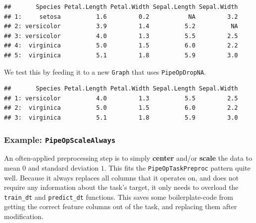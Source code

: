 \documentclass[]{scrbook}
\newenvironment{Shaded}{\begin{snugshade}}{\end{snugshade}}
\newcommand{\DecValTok}[1]{\textcolor[rgb]{0.00,0.00,0.81}{#1}}
\newcommand{\KeywordTok}[1]{\textcolor[rgb]{0.13,0.29,0.53}{\textbf{#1}}}
\newcommand{\NormalTok}[1]{#1}
\newcommand{\OperatorTok}[1]{\textcolor[rgb]{0.81,0.36,0.00}{\textbf{#1}}}
\newcommand{\StringTok}[1]{\textcolor[rgb]{0.31,0.60,0.02}{#1}}
\renewenvironment{Shaded} {\begin{snugshade}\small} {\end{snugshade}}
\begin{document}
\begin{verbatim}
##       Species Petal.Length Petal.Width Sepal.Length Sepal.Width
## 1:     setosa          1.6         0.2           NA         3.2
## 2: versicolor          3.9         1.4          5.2          NA
## 3: versicolor          4.0         1.3          5.5         2.5
## 4:  virginica          5.0         1.5          6.0         2.2
## 5:  virginica          5.1         1.8          5.9         3.0
\end{verbatim}

We test this by feeding it to a new \texttt{Graph} that uses \texttt{PipeOpDropNA}.

\begin{Shaded}
\end{Shaded}

\begin{verbatim}
##       Species Petal.Length Petal.Width Sepal.Length Sepal.Width
## 1: versicolor          4.0         1.3          5.5         2.5
## 2:  virginica          5.0         1.5          6.0         2.2
## 3:  virginica          5.1         1.8          5.9         3.0
\end{verbatim}

\hypertarget{example-pipeopscalealways}{%
\subsubsection{\texorpdfstring{Example: \texttt{PipeOpScaleAlways}}{Example: PipeOpScaleAlways}}\label{example-pipeopscalealways}}

An often-applied preprocessing step is to simply \textbf{center} and/or \textbf{scale} the data to mean \(0\) and standard deviation \(1\).
This fits the \texttt{PipeOpTaskPreproc} pattern quite well.
Because it always replaces all columns that it operates on, and does not require any information about the task's target, it only needs to overload the \texttt{train\_dt} and \texttt{predict\_dt} functions.
This saves some boilerplate-code from getting the correct feature columns out of the task, and replacing them after modification.
\end{document}
